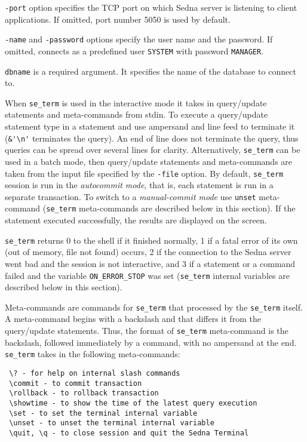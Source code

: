 \documentclass[a4paper,12pt]{article}
\begin{document}
\verb!-port! option specifies the TCP port on which Sedna server is listening to
client applications. If omitted, port number 5050 is used by default.

\verb!-name! and \verb!-password! options specify the user name and the
password. If omitted, connects as a predefined user \verb!SYSTEM! with password
\verb!MANAGER!.

\verb!dbname! is a required argument. It specifies the name of the database to
connect to.

When \verb!se_term! is used in the interactive mode it takes in query/update
statements and meta-commands from stdin. To execute a query/update statement
type in a statement and use ampersand and line feed to terminate it
(\verb!&'\n'! terminates the query). An end of line does not terminate the
query, thus queries can be spread over several lines for clarity. Alternatively,
\verb!se_term! can be used in a batch mode, then query/update statements and
meta-commands are taken from the input file specified by the \verb!-file!
option. By default, \verb!se_term! session is run in the \emph{autocommit mode},
that is, each statement is run in a separate transaction. To switch to a
\emph{manual-commit mode} use \verb!unset! meta-command (\verb!se_term!
meta-commands are described below in this section). If the statement executed
successfully, the results are displayed on the screen.

\verb!se_term! returns 0 to the shell if it finished normally, 1 if a fatal
error of its own (out of memory, file not found) occurs, 2 if the connection to
the Sedna server went bad and the session is not interactive, and 3 if a
statement or a command failed and the variable \verb!ON_ERROR_STOP! was set
(\verb!se_term! internal variables are described below in this section).

Meta-commands are commands for \verb!se_term! that processed by the
\verb!se_term! itself. A meta-command begins with a backslash and that differs
it from the query/update statements. Thus, the format of \verb!se_term!
meta-command is the backslash, followed immediately by a command, with no
ampersand at the end. \verb!se_term! takes in the following meta-commands:

\small{
\begin{verbatim}
 \? - for help on internal slash commands
 \commit - to commit transaction
 \rollback - to rollback transaction
 \showtime - to show the time of the latest query execution
 \set - to set the terminal internal variable
 \unset - to unset the terminal internal variable
 \quit, \q - to close session and quit the Sedna Terminal
\end{verbatim}}
\end{document}
